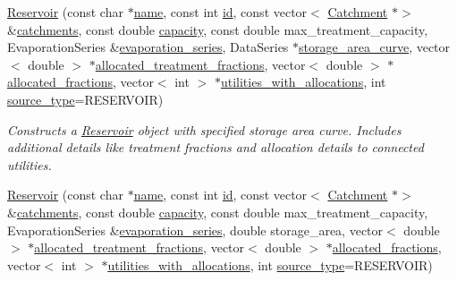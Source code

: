 \begin{DoxyCompactItemize}
\mbox{\hyperlink{classReservoir_a1a6f078a9565dcb65843d3575bdd4172}{Reservoir}} (const char $\ast$\mbox{\hyperlink{classWaterSource_a846ea74c5b453d014f594d41fee8c765}{name}}, const int \mbox{\hyperlink{classWaterSource_a6eafe5dfefd317877d1244e8a7c6e742}{id}}, const vector$<$ \mbox{\hyperlink{classCatchment}{Catchment}} $\ast$$>$ \&\mbox{\hyperlink{classWaterSource_a8c18c34f23f8a06685c1d12f462ed830}{catchments}}, const double \mbox{\hyperlink{classWaterSource_a2ec257b415b248214a8bce7fc5267723}{capacity}}, const double max\+\_\+treatment\+\_\+capacity, Evaporation\+Series \&\mbox{\hyperlink{classReservoir_a2d2d9b302c13703309bb798d24136810}{evaporation\+\_\+series}}, Data\+Series $\ast$\mbox{\hyperlink{classReservoir_a46bd5b750963dfa9a57b247fd77ab8ff}{storage\+\_\+area\+\_\+curve}}, vector$<$ double $>$ $\ast$\mbox{\hyperlink{classWaterSource_aa73fe10cfc6579b2fb79529e1dde5140}{allocated\+\_\+treatment\+\_\+fractions}}, vector$<$ double $>$ $\ast$\mbox{\hyperlink{classWaterSource_a2f6655a80c4847fe039987255d9d998c}{allocated\+\_\+fractions}}, vector$<$ int $>$ $\ast$\mbox{\hyperlink{classWaterSource_ac345583fc2d0f7e1db31ee40244d7ace}{utilities\+\_\+with\+\_\+allocations}}, int \mbox{\hyperlink{classWaterSource_afdd12c29fc74ea21dff1f1be9b8c2b7b}{source\+\_\+type}}=R\+E\+S\+E\+R\+V\+O\+IR)
\begin{DoxyCompactList}\small\item\em Constructs a \mbox{\hyperlink{classReservoir}{Reservoir}} object with specified storage area curve. Includes additional details like treatment fractions and allocation details to connected utilities. \end{DoxyCompactList}\item 
\mbox{\hyperlink{classReservoir_a617f90b97899699d7e0dd97e7ebb34bc}{Reservoir}} (const char $\ast$\mbox{\hyperlink{classWaterSource_a846ea74c5b453d014f594d41fee8c765}{name}}, const int \mbox{\hyperlink{classWaterSource_a6eafe5dfefd317877d1244e8a7c6e742}{id}}, const vector$<$ \mbox{\hyperlink{classCatchment}{Catchment}} $\ast$$>$ \&\mbox{\hyperlink{classWaterSource_a8c18c34f23f8a06685c1d12f462ed830}{catchments}}, const double \mbox{\hyperlink{classWaterSource_a2ec257b415b248214a8bce7fc5267723}{capacity}}, const double max\+\_\+treatment\+\_\+capacity, Evaporation\+Series \&\mbox{\hyperlink{classReservoir_a2d2d9b302c13703309bb798d24136810}{evaporation\+\_\+series}}, double storage\+\_\+area, vector$<$ double $>$ $\ast$\mbox{\hyperlink{classWaterSource_aa73fe10cfc6579b2fb79529e1dde5140}{allocated\+\_\+treatment\+\_\+fractions}}, vector$<$ double $>$ $\ast$\mbox{\hyperlink{classWaterSource_a2f6655a80c4847fe039987255d9d998c}{allocated\+\_\+fractions}}, vector$<$ int $>$ $\ast$\mbox{\hyperlink{classWaterSource_ac345583fc2d0f7e1db31ee40244d7ace}{utilities\+\_\+with\+\_\+allocations}}, int \mbox{\hyperlink{classWaterSource_afdd12c29fc74ea21dff1f1be9b8c2b7b}{source\+\_\+type}}=R\+E\+S\+E\+R\+V\+O\+IR)

\end{DoxyCompactItemize}

